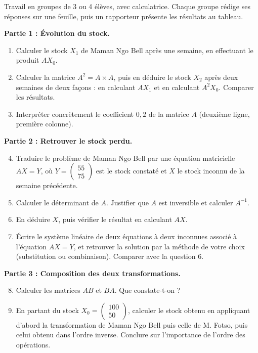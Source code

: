 \documentclass[11pt]{article}
\newcounter{popsec}
\newcounter{popsub}
\newcommand{\courssub}[1]{%
  \stepcounter{popsub}%
  \par\vspace{9pt}\noindent{\popxbold\fontsize{11.5}{13}\selectfont\color{popink}{\color{poporange}\thepopsec.\thepopsub}\hspace{6pt}#1}\par\nopagebreak\vspace{4pt}
}
\begin{document}
\courssub{Consignes}

Travail en groupes de 3 ou 4 élèves, avec calculatrice. Chaque groupe rédige ses réponses sur une feuille, puis un rapporteur présente les résultats au tableau.

\textbf{Partie 1 : Évolution du stock.}
\begin{enumerate}
\item Calculer le stock $X_1$ de Maman Ngo Bell après une semaine, en effectuant le produit $A X_0$.
\item Calculer la matrice $A^2 = A \times A$, puis en déduire le stock $X_2$ après deux semaines de deux façons : en calculant $A X_1$ et en calculant $A^2 X_0$. Comparer les résultats.
\item Interpréter concrètement le coefficient $0,2$ de la matrice $A$ (deuxième ligne, première colonne).
\end{enumerate}

\textbf{Partie 2 : Retrouver le stock perdu.}
\begin{enumerate}
\setcounter{enumi}{3}
\item Traduire le problème de Maman Ngo Bell par une équation matricielle $A X = Y$, où $Y = \begin{pmatrix} 55 \\ 75 \end{pmatrix}$ est le stock constaté et $X$ le stock inconnu de la semaine précédente.
\item Calculer le déterminant de $A$. Justifier que $A$ est inversible et calculer $A^{-1}$.
\item En déduire $X$, puis vérifier le résultat en calculant $A X$.
\item Écrire le système linéaire de deux équations à deux inconnues associé à l'équation $A X = Y$, et retrouver la solution par la méthode de votre choix (substitution ou combinaison). Comparer avec la question 6.
\end{enumerate}

\textbf{Partie 3 : Composition des deux transformations.}
\begin{enumerate}
\setcounter{enumi}{7}
\item Calculer les matrices $AB$ et $BA$. Que constate-t-on ?
\item En partant du stock $X_0 = \begin{pmatrix} 100 \\ 50 \end{pmatrix}$, calculer le stock obtenu en appliquant d'abord la transformation de Maman Ngo Bell puis celle de M. Fotso, puis celui obtenu dans l'ordre inverse. Conclure sur l'importance de l'ordre des opérations.
\end{enumerate}
\end{document}

